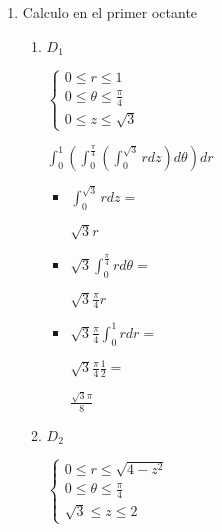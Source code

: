 \documentclass[../practica_09.tex]{subfiles}
\begin{document}
    \begin{enumerate}
        \item Calculo en el primer octante
        
            \begin{enumerate}
                \item $D_1$

                    $\left \{\begin{array}{ll}
                        0 \leq r \leq 1 \\
                        0 \leq \theta \leq \frac{\pi}{4}\\
                        0 \leq z \leq \sqrt{3}
                    \end{array}
                    \right.$

                    $\int_0^1 (\int_0^{\frac{\pi}{4}} (\int_0^{\sqrt{3}} r dz) d\theta )dr$

                    \begin{itemize}
                        \item $\int_0^{\sqrt{3}} r dz = $
                        
                            $ \sqrt{3}r$

                        \item $\sqrt{3} \int_0^{\frac{\pi}{4}} r d\theta = $
                        
                            $ \sqrt{3} \frac{\pi}{4} r $

                        \item $\sqrt{3} \frac{\pi}{4} \int_0^1 r dr =$
                        
                            $ \sqrt{3} \frac{\pi}{4} \frac{1}{2} = $

                            $  \frac{\sqrt{3}\pi}{8} $

                    \end{itemize}

                \item $D_2$

                    $\left \{\begin{array}{ll}
                        0 \leq r \leq \sqrt{4-z^2} \\
                        0 \leq \theta \leq \frac{\pi}{4}\\
                        \sqrt{3} \leq z \leq 2
                    \end{array}
                    \right.$


\end{enumerate}
\end{enumerate}
\end{document}
